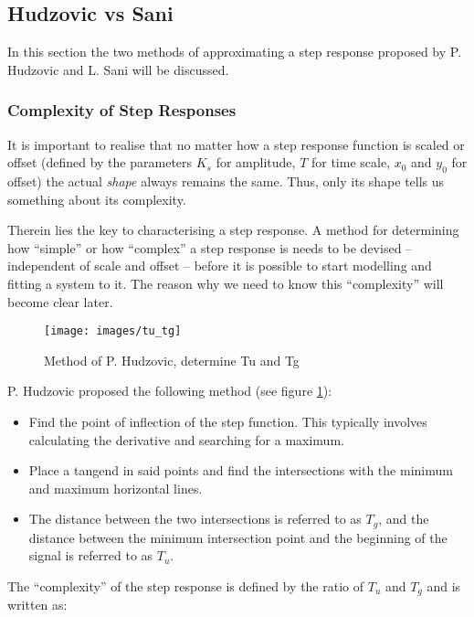 \subsection{Hudzovic vs Sani}

In this section the  two methods of approximating a step response proposed by P.
Hudzovic\cite{ref:hudzovic}  and  L.  Sani\cite{ref:sani}  will   be  discussed.


\subsubsection{Complexity of Step Responses}

It is important to realise that no matter how a step response function is scaled
or  offset  (defined  by the parameters $K_s$ for amplitude, $T$ for time scale,
$x_0$ and $y_0$ for offset) the actual \textit{shape}  always  remains the same.
Thus, only its shape tells us something about its complexity.

Therein lies the key to characterising a step response. A method for determining
how  ``simple''  or how ``complex'' a step response is needs to  be  devised  --
independent of scale and offset -- before it is possible to start modelling  and
fitting a system to it. The reason why we need to know  this ``complexity'' will
become clear later.

\begin{figure}
    \texttt{[image: images/tu\_tg]}
    \caption{Method of P. Hudzovic, determine Tu and Tg}
    \label{fig:tu_tg}
\end{figure}

P. Hudzovic proposed the following method (see figure \ref{fig:tu_tg}):
\begin{itemize}
    \item
Find  the  point  of  inflection of the step function. This  typically  involves
calculating the derivative and searching for a maximum.
    \item
Place a tangend in said points and find the intersections  with  the minimum and
maximum horizontal lines.
    \item
The distance between the two intersections  is  referred  to  as  $T_g$, and the
distance between  the minimum intersection point and the beginning of the signal
is referred to as $T_u$.
\end{itemize}
The ``complexity'' of the  step  response  is  defined by the ratio of $T_u$ and
$T_g$ and is written as:


